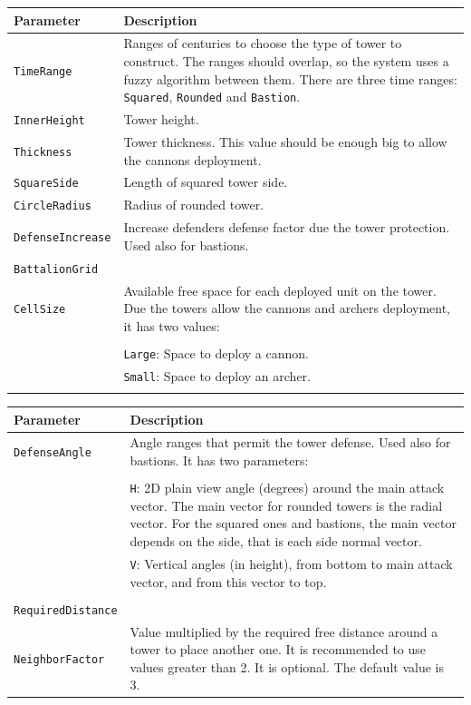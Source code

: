 \documentclass[tog]{acmsiggraph}
\begin{document}
\begin{tabularx}{0.48\textwidth}{ |l|X| }
\hline 
\textbf{Parameter} & \textbf{Description} \\[0.15cm]
 \hline
 \texttt{TimeRange} & Ranges of centuries to choose the type of tower to construct. The ranges should overlap, so the system uses a fuzzy algorithm between them. There are three time ranges: \texttt{Squared}, \texttt{Rounded} and \texttt{Bastion}. \\
 \hline
 \texttt{InnerHeight} & Tower height. \\
 \hline
 \texttt{Thickness} & Tower thickness. This value should be enough big to allow the cannons deployment. \\
 \hline
 \texttt{SquareSide} & Length of squared tower side. \\
 \hline
 \texttt{CircleRadius} & Radius of rounded tower. \\
 \hline
 \texttt{DefenseIncrease} & Increase defenders defense factor due the tower protection. Used also for bastions.\\
 \hline
 \texttt{BattalionGrid} & \\
 \texttt{CellSize} &  Available free space for each deployed unit on the tower. Due the towers allow the cannons and archers deployment, it has two values: \\
 & \\
 & \quad\texttt{Large}: Space to deploy a cannon. \\
 & \quad\texttt{Small}: Space to deploy an archer. \\
 & \\
 \hline
\end{tabularx}  
 
\begin{tabularx}{0.48\textwidth}{ |l|X| }
\hline 
\textbf{Parameter} & \textbf{Description} \\[0.15cm]
 \hline
 \texttt{DefenseAngle} & Angle ranges that permit the tower defense. Used also for bastions. It has two parameters: \\
 & \\
 & \quad\texttt{H}: 2D plain view angle (degrees) around the main attack vector. The main vector for rounded towers is the radial vector. For the squared ones and bastions, the main vector depends on the side, that is each side normal vector. \\
 & \quad\texttt{V}: Vertical angles (in height), from bottom to main attack vector, and from this vector to top. \\
 & \\
 \hline
 \texttt{RequiredDistance} & \\
 \texttt{NeighborFactor} & Value multiplied by the required free distance around a tower to place another one. It is recommended to use values greater than 2. It is optional. The default value is 3.\\
 \hline
\end{tabularx} 
\end{document}
